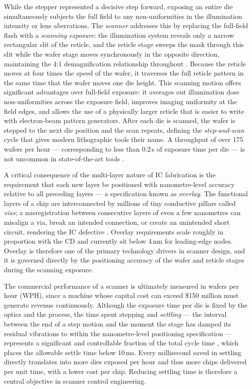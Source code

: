 \documentclass[11pt]{article}
\theoremstyle{definition}
\begin{document}
While the stepper represented a decisive step forward, exposing an entire die simultaneously subjects the full field to any non-uniformities in the illumination intensity or lens aberrations. The \textit{scanner} addresses this by replacing the full-field flash with a \textit{scanning exposure}: the illumination system reveals only a narrow rectangular slit of the reticle, and the reticle stage sweeps the mask through this slit while the wafer stage moves synchronously in the opposite direction, maintaining the 4:1 demagnification relationship throughout \cite{Butler2011_PositionControl, Schmidt2012_UltraPrecision}. Because the reticle moves at four times the speed of the wafer, it traverses the full reticle pattern in the same time that the wafer moves one die height. This scanning motion offers significant advantages over full-field exposure: it averages out illumination dose non-uniformities across the exposure field, improves imaging uniformity at the field edges, and allows the use of a physically larger reticle that is easier to write with electron-beam pattern generators. After each die is scanned, the wafer is stepped to the next die position and the scan repeats, defining the \textit{step-and-scan} cycle that gives modern lithographic tools their name. A throughput of over 175 wafers per hour — corresponding to less than 0.2\,s of exposure time per die — is not uncommon in state-of-the-art tools \cite{Butler2011_PositionControl}.

A critical consequence of the multi-layer nature of IC fabrication is the requirement that each new layer be positioned with nanometre-level accuracy relative to all preceding layers — a specification known as \textit{overlay}. The functional layers of a chip are interconnected by millions of tiny conductive pillars called \textit{vias}; a misregistration between consecutive layers of even a few nanometres can misalign a via, break an intended connection, or create an unintended short circuit, rendering the IC defective \cite{Schmidt2012_UltraPrecision}. Overlay requirements scale roughly in proportion with the CD and currently sit below 4\,nm for leading-edge nodes. Overlay is therefore one of the primary technology drivers in scanner design, and it is governed directly by the positioning accuracy of the wafer and reticle stages during the scanning exposure.

The commercial performance of a scanner is ultimately measured in wafers per hour (WPH), since a machine whose capital cost can exceed \$150 million must generate revenue continuously. Although the exposure time per die is fixed by the optics and the process, the time spent stepping and \textit{settling} — the interval between the end of a step motion and the moment the stage has damped its residual vibrations to within the nanometre-level positioning specification — represents a significant and controllable fraction of the total cycle time \cite{Butler2011_PositionControl}, which places the allowable settle time below 10\,ms. Every millisecond saved in settling directly translates into more dies exposed per hour and thus more chips delivered per unit time, with a lower cost per chip. Reducing settling time is therefore a central objective in scanner control engineering.
\end{document}
